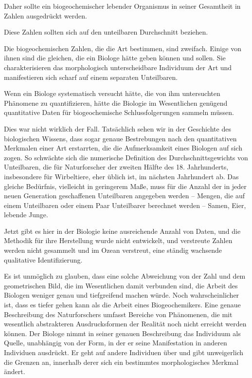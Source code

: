 \documentclass[11pt,a4paper]{book}
\begin{document}
Daher sollte ein biogeochemischer lebender Organismus in seiner Gesamtheit in Zahlen ausgedrückt werden.



Diese Zahlen sollten sich auf den unteilbaren Durchschnitt beziehen.



Die biogeochemischen Zahlen, die die Art bestimmen, sind zweifach. Einige von ihnen sind die gleichen, die ein Biologe hätte geben können und sollen. Sie charakterisieren das morphologisch unterscheidbare Individuum der Art und manifestieren sich scharf auf einem separaten Unteilbaren.



Wenn ein Biologe systematisch versucht hätte, die von ihm untersuchten Phänomene zu quantifizieren, hätte die Biologie im Wesentlichen genügend quantitative Daten für biogeochemische Schlussfolgerungen sammeln müssen.



Dies war nicht wirklich der Fall. Tatsächlich sehen wir in der Geschichte des biologischen Wissens, dass sogar genaue Bestrebungen nach den quantitativen Merkmalen einer Art erstarrten, die die Aufmerksamkeit eines Biologen auf sich zogen. So schwächte sich die numerische Definition des Durchschnittsgewichts von Unteilbaren, die für Naturforscher der zweiten Hälfte des 18. Jahrhunderts, insbesondere für Wirbeltiere, eher üblich ist, im nächsten Jahrhundert ab. Das gleiche Bedürfnis, vielleicht in geringerem Maße, muss für die Anzahl der in jeder neuen Generation geschaffenen Unteilbaren angegeben werden -- Mengen, die auf einem Unteilbaren oder einem Paar Unteilbarer berechnet werden -- Samen, Eier, lebende Junge.



Jetzt gibt es hier in der Biologie keine ausreichende Anzahl von Daten, und die Methodik für ihre Herstellung wurde nicht entwickelt, und verstreute Zahlen werden nicht gesammelt und im Ozean verstreut, eine ständig wachsende qualitative Identifizierung.



Es ist unmöglich zu glauben, dass eine solche Abweichung von der Zahl und dem geometrischen Bild, die im Wesentlichen damit verbunden sind, die Arbeit des Biologen weniger genau und tiefgreifend machen würde. Noch wahrscheinlicher ist, dass es tiefer gehen kann als die Arbeit eines Biogeochemikers. Eine genaue Beschreibung des Naturforschers umfasst Bereiche von Phänomenen, die mit wesentlich abstrakteren Ausdrucksformen der Realität noch nicht erreicht werden können. Der Biologe nimmt in seiner genauen Beschreibung das Individuum als Quelle, unabhängig von der Form, in der er seine Manifestation in anderen Individuen ausdrückt. Er geht auf andere Individuen über und gibt unweigerlich die Grenzen an, innerhalb derer sich ein bestimmtes morphologisches Merkmal ändert.
\end{document}
